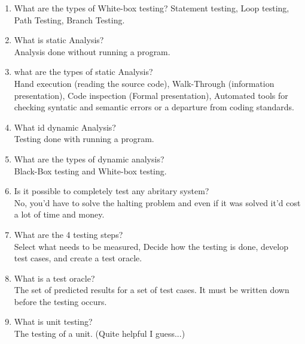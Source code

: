\documentclass[10pt]{article}
\begin{document}
\begin{enumerate}
    \item What are the types of White-box testing?
          Statement testing, Loop testing, Path Testing, Branch Testing.\\

    \item What is static Analysis?\\
          Analysis done without running a program.

    \item what are the types of static Analysis?\\
          Hand execution (reading the source code), Walk-Through (information presentation), Code inspection (Formal presentation), Automated tools for checking syntatic and semantic errors or a departure from coding standards.\\

    \item What id dynamic Analysis?\\
          Testing done with running a program.\\

    \item What are the types of dynamic analysis?\\
          Black-Box testing and White-box testing.\\

    \item Is it possible to completely test any abritary system?\\
          No, you'd have to solve the halting problem and even if it was solved it'd cost a lot of time and money.\\


    \item What are the 4 testing steps?\\
          Select what needs to be measured, Decide how the testing is done, develop test cases, and create a test oracle.


    \item What is a test oracle?\\
          The set of predicted results for a set of test cases. It must be written down before the testing occurs.\\

    \item What is unit testing?\\
          The testing of a unit. (Quite helpful I guess...)\\


\end{enumerate}
\end{document}
